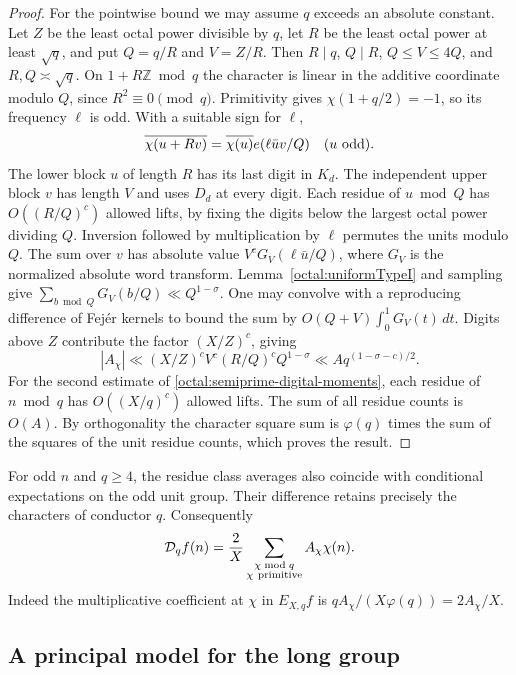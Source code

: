 \documentclass[11pt,a4paper]{article}
\theoremstyle{paperplain}
\numberwithin{equation}{section}
\begin{document}
\begin{proof}
For the pointwise bound we may assume \(q\) exceeds an absolute
constant. Let \(Z\) be the least octal power divisible by \(q\),
let \(R\) be the least octal power at least \(\sqrt q\), and put
\(Q=q/R\) and \(V=Z/R\). Then \(R\mid q\), \(Q\mid R\),
\(Q\le V\le4Q\), and \(R,Q\asymp\sqrt q\). On \(1+R\mathbb Z\bmod q\)
the character is linear in the additive coordinate modulo \(Q\),
since \(R^2\equiv0\pmod q\). Primitivity gives
\(\chi(1+q/2)=-1\), so its frequency \(\ell\) is odd. With a
suitable sign for \(\ell\),
\[
 \overline{\chi(u+Rv)}=\overline{\chi(u)}e(\ell\bar u v/Q)
 \quad(u\ {\rm odd}).
\]
The lower block \(u\) of length \(R\) has its last digit in $K_d$.
The independent upper block \(v\) has length \(V\) and uses $D_d$
at every digit. Each residue of \(u\bmod Q\)
has \(O((R/Q)^c)\) allowed lifts, by fixing the digits below the
largest octal power dividing \(Q\). Inversion followed by
multiplication by \(\ell\) permutes the units modulo \(Q\).
The sum over \(v\) has absolute value \(V^cG_V(\ell\bar u/Q)\),
where \(G_V\) is the normalized absolute word transform.
Lemma~\ref{octal:uniformTypeI} and sampling give
\(\sum_{b\bmod Q}G_V(b/Q)\ll Q^{1-\sigma}\). One may convolve
with a reproducing difference of Fej\'er kernels to bound the sum
by \(O(Q+V)\int_0^1G_V(t)\,dt\).
Digits above \(Z\) contribute the factor \((X/Z)^c\), giving
\[
 |A_\chi|\ll (X/Z)^c V^c(R/Q)^c Q^{1-\sigma}
       \ll A q^{(1-\sigma-c)/2}.
\]
For the second estimate of \eqref{octal:semiprime-digital-moments},
each residue of \(n\bmod q\) has \(O((X/q)^c)\) allowed lifts.
The sum of all residue counts is \(O(A)\). By orthogonality the
character square sum is \(\varphi(q)\) times the sum of the squares
of the unit residue counts, which proves the result.
\end{proof}


For odd \(n\) and \(q\ge4\), the residue class averages also coincide
with conditional expectations on the odd unit group. Their
difference retains precisely the characters of conductor \(q\).
Consequently
\begin{equation}\label{octal:dyadic-char-expansion}
 \mathcal D_q f(n)=\frac2X
      \sum_{\substack{\chi\bmod q\\\chi\ {\rm primitive}}}
                     A_\chi\chi(n).
\end{equation}
Indeed the multiplicative coefficient at \(\chi\) in \(E_{X,q}f\)
is \(q A_\chi/(X\varphi(q))=2A_\chi/X\).


\subsection{A principal model for the long group}
\label{sec:principal-grouped-models}
\end{document}
